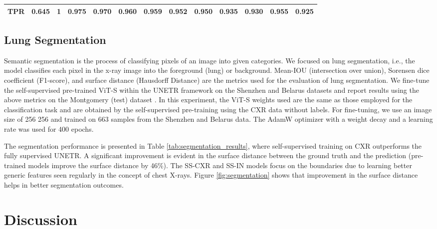 \documentclass[10pt,journal,compsoc]{IEEEtran}
\begin{document}
\begin{table*}[t]
{\begin{tabular}{l|c|ccccccccccc}
\textbf{TPR} & 0.645 & \textbf{1} & 0.975 &0.970 & 0.960 & 0.959 &0.952 & 0.950 & 0.935& 0.930 &0.955 &0.925 \\ \hline
\end{tabular}
}
\end{table*}


\subsection{Lung Segmentation}
\label{sec:lungsegmentation}
Semantic segmentation is the process of classifying pixels of an image into given categories. We focused on lung segmentation, i.e., the model classifies each pixel in the x-ray image into the foreground (lung) or background. Mean-IOU (intersection over union), Sorensen dice coefficient (F1-score), and surface distance (Hausdorff Distance) are the metrics used for the evaluation of lung segmentation. We fine-tune the self-supervised pre-trained ViT-S\cite{dosovitskiy2020image} within the UNETR framework on the Shenzhen \cite{jaeger2013automatic} and Belarus datasets and report results using the above metrics on the Montgomery (test) dataset \cite{candemir2013lung}. In this experiment, the ViT-S weights used are the same as those employed for the classification task and are obtained by the self-supervised pre-training using the CXR data without labels. For fine-tuning, we use an image size of 256  256 and trained on 663 samples from the Shenzhen \cite{jaeger2013automatic} and Belarus data. The AdamW optimizer\cite{adamw} with a weight decay  and a learning rate  was used for 400 epochs. 

The segmentation performance is presented in Table \ref{tab:segmentation_results}, where self-supervised training on CXR outperforms the fully supervised UNETR. A significant improvement is evident in the surface distance between the ground truth and the prediction (pre-trained models improve the surface distance by 46\%). The SS-CXR and SS-IN models focus on the boundaries due to learning better generic features seen regularly in the concept of chest X-rays. Figure \ref{fig:segmentation} shows that improvement in the surface distance helps in better segmentation outcomes.














\section{Discussion}
\end{document}

